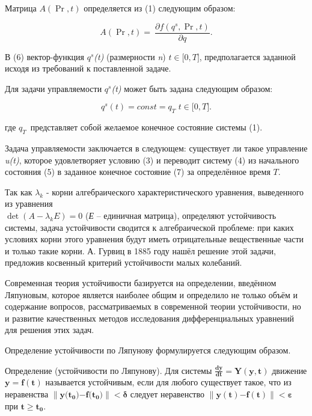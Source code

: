 Матрица \(A\left( \Pr,t \right)\) определяется из (1) следующим образом:

\begin{equation}
A\left( \Pr,t \right) = \ \frac{\partial f\left( q^{s},\Pr,t \right)}{\partial q}.
\end{equation} 

В (6) вектор-функция \(q^{s}\)\emph{(t)} (размерности \emph{n})
\(t \in \lbrack 0,T\rbrack\), предполагается заданной исходя из
требований к поставленной задаче.

Для задачи управляемости \(q^{s}\)\emph{(t)} может быть задана следующим
образом:

\begin{equation}
q^{s}(t) = const = q_{T\ }\, t \in \lbrack 0,T\rbrack.
\end{equation} 

где \(q_{T\ }\) представляет собой желаемое конечное состояние системы
(1).

Задача управляемости заключается в следующем: существует ли такое
управление \emph{u(t)}, которое удовлетворяет условию (3) и переводит
систему (4) из начального состояния (5) в заданное конечное состояние
(7) за определённое время \(T.\)

Так как $\lambda_k$ - корни алгебраического
характеристического уравнения, выведенного из уравнения 
\\ \boldmath$\det(A-\lambda_kE)= 0$ (\emph{Е} -- единичная матрица), определяют устойчивость системы, задача
устойчивости сводится к алгебраической проблеме: при каких условиях
корни этого уравнения будут иметь отрицательные вещественные части и
только такие корни. А. Гурвиц в 1885 году нашёл решение этой задачи,
предложив косвенный критерий устойчивости малых колебаний.

Современная теория устойчивости базируется на определении, введённом
Ляпуновым, которое является наиболее общим и определило не только объём
и содержание вопросов, рассматриваемых в современной теории
устойчивости, но и развитие качественных методов исследования
дифференциальных уравнений для решения этих задач.

Определение устойчивости по Ляпунову формулируется следующим образом.

Определение (устойчивости по Ляпунову). Для системы
\(\frac{\mathbf{dy}}{\mathbf{dt}}\mathbf{= Y}\left( \mathbf{y,t} \right)\)
движение \(\mathbf{y = f(t)}\) называется устойчивым, если для любого
 существует  такое,
что из неравенства
\(\left\| \mathbf{y(}\mathbf{t}_{\mathbf{0}}\mathbf{)}\mathbf{-}\mathbf{f(}\mathbf{t}_{\mathbf{0}}\mathbf{)} \right\|\mathbf{< \delta}\)
следует неравенство
\(\left\| \mathbf{y(t)}\mathbf{-}\mathbf{f(t)} \right\|\mathbf< \pmb{\varepsilon}\)
при \(\mathbf{t}\mathbf{\geq}\mathbf{t}_{\mathbf{0}}\).

